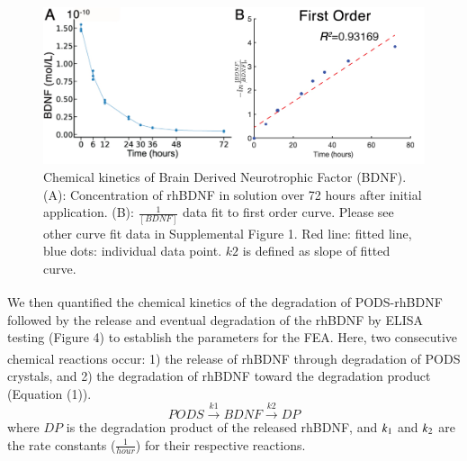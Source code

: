 \documentclass[review]{elsarticle}
\begin{document}
\begin{figure}
	\begin{center}
		\includegraphics[width=12.5cm]{Fig_4.jpg}
	\end{center}
	\caption{Chemical kinetics of Brain Derived Neurotrophic Factor (BDNF). (A): Concentration of rhBDNF in solution over 72 hours after initial application. (B): $\frac{1}{[BDNF]}$ data fit to first order curve. Please see other curve fit data in Supplemental Figure 1. Red line: fitted line, blue dots: individual data point. $k2$ is defined as slope of fitted curve.} 
\end{figure}

\indent We then quantified the chemical kinetics of the degradation of PODS\textsuperscript{\textregistered}-rhBDNF followed by the release and eventual degradation of the rhBDNF by ELISA testing (Figure 4) to establish the parameters for the FEA. Here, two consecutive chemical reactions occur: 1) the release of rhBDNF through degradation of PODS\textsuperscript{\textregistered} crystals, and 2) the degradation of rhBDNF toward the degradation product (Equation (1)). 
\begin{equation}
	PODS\overset{k1}{\longrightarrow}BDNF\overset{k2}{\longrightarrow}DP
\end{equation}
where $DP$ is the degradation product of the released rhBDNF, and $k\textsubscript{1}$ and $k\textsubscript{2}$ are the rate constants ($\frac{1}{hour}$) for their respective reactions.
\end{document}
